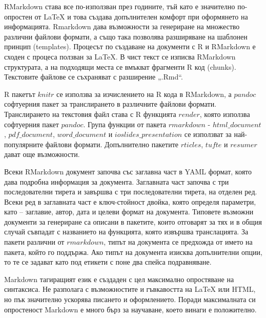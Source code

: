 RMarkdown става все по-използван през годините, тъй като е значително по-опростен от LaTeX и това създава допълнителен комфорт при оформянето на информацията. Rmarkdown дава възможности за генериране на множество различни файлови формати, а също така позволява разширяване на шаблонен принцип (templates). Процесът по създаване на документи с R и RMarkdown е сходен с процеса ползван за LaTeX. В чист текст се изписва RMarkdown структурата, а на подходящи места се вмъкват фрагменти R код (chunks). Текстовите файлове се съхраняват с разширение „.Rmd“.

R пакетът $knitr$ се използва за изчислението на R кода в RMarkdown, а $pandoc$ софтуерния пакет за транслирането в различните файлови формати. Транслирането на текстовия файл става с R функцията $render$, която използва софтуерния пакет $pandoc$. Група функции от пакета $rmarkdown$ - $html\_document$, $pdf\_document$, $word\_document$ и $ioslides\_presentation$ се използват за най-популярните файлови формати. Допълнително пакетите $rticles$, $tufte$ и $resumer$ дават още възможности.

Всеки RMarkdown документ започва със заглавна част в YAML формат, която дава подробна информация за документа. Заглавната част започва с три последователни тирета и завършва с три последователни тирета, на отделен ред. Всеки ред в заглавната част е ключ-стойност двойка, която определя параметри, като – заглавие, автор, дата и целеви формат на документа. Типовете възможни документи за генериране са описани в пакетите, които отговарят за тях и в общия случай съвпадат с названието на функцията, която извършва транслацията. За пакети различни от $rmarkdown$, типът на документа се предхожда от името на пакета, който го поддържа. Ако типът на документа изисква допълнителни опции, то те се задават като под етикети с поне два спейса подравняване. 

Markdown тагиращият език е създаден с цел максимално опростяване на синтаксиса. Не разполага с възможностите и гъвкавостта на LaTeX или HTML, но пък значително ускорява писането и оформлението. Поради максималната си опростеност Markdown е много бърз за научаване, което винаги е положително. 

